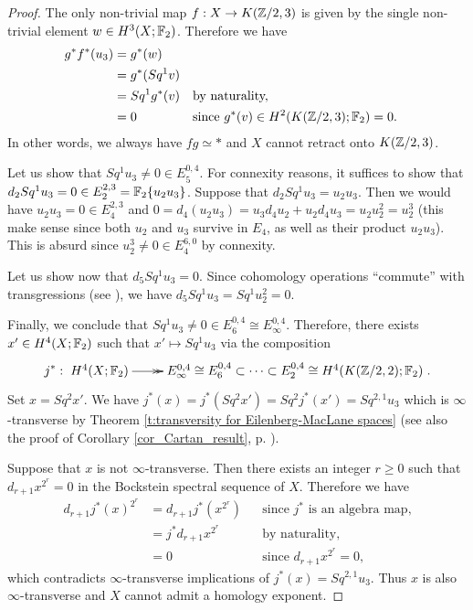 \begin{proof}
The only non-trivial map $f:X\to K(\mathbb{Z}/2,3)$ is given by the single non-trivial element $w\in H^3(X;\mathbb{F}_2)$. Therefore we have \begin{align*}
g^*f^*(u_3)&=g^*(w)\\
&=g^*(Sq^1v)\\
&=Sq^1g^*(v) &&\text{by naturality,}\\
&=0 &&\text{since $g^*(v)\in H^2(K(\mathbb{Z}/2,3);\mathbb{F}_2)=0$.}
\end{align*} In other words, we always have $fg\simeq*$ and $X$ cannot retract onto $K(\mathbb{Z}/2,3)$.

Let us show that $Sq^1u_3\not=0\in E_5^{0,4}$. For connexity reasons, it suffices to show that $d_2Sq^1u_3=0\in E_2^{2,3}=\mathbb{F}_2\{u_2u_3\}$. Suppose that $d_2Sq^1u_3=u_2u_3$. Then we would have $u_2u_3=0\in E_4^{2,3}$ and $0=d_4(u_2u_3)=u_3d_4u_2+u_2d_4u_3=u_2u_2^2=u_2^3$ (this make sense since both $u_2$ and $u_3$ survive in $E_4$, as well as their product $u_2u_3$). This is absurd since $u_2^3\not=0\in E_4^{6,0}$ by connexity. 

Let us show now that $d_5Sq^1u_3=0$. Since cohomology operations ``commute'' with transgressions (see \cite[Corollary 6.9, p. 189]{Mc00}), we have $d_5Sq^1u_3=Sq^1 u_2^2=0$. 

Finally, we conclude that $Sq^1u_3\not=0\in E_6^{0,4}\cong E_\infty^{0,4}$. Therefore, there exists $x'\in H^4(X;\mathbb{F}_2)$ such that $x'\mapsto Sq^1u_3$ via the composition
$$
j^*:\xymatrix{H^4(X;\F_2)\ar@{->>}[r] &E^{0,4}_\infty\cong E^{0,4}_6\subset\dots\subset E^{0,4}_2\cong H^4(K(\Z/2,2);\F_2)}.
$$ Set $x=Sq^2x'$. We have $j^*(x)=j^*(Sq^2x')=Sq^2j^*(x')=Sq^{2,1}u_3$ which is $\infty$-transverse by Theorem \ref{t:transversity for Eilenberg-MacLane spaces} (see also the proof of Corollary \ref{cor_Cartan_result}, p. \pageref{c:Cartan_result}). 

\label{arg:no_retract}Suppose that $x$ is not $\infty$-transverse. Then there exists an integer $r\geq0$ such that $d_{r+1}x^{2^r}=0$ in the Bockstein spectral sequence of $X$. Therefore we have
\begin{align*}
d_{r+1}j^*(x)^{2^r} &=d_{r+1}j^*(x^{2^r}) &&\text{since $j^*$ is an algebra map,}\\
&=j^*d_{r+1}x^{2^r} &&\text{by naturality,}\\
&=0 &&\text{since $d_{r+1}x^{2^r}=0$},
\end{align*} which contradicts $\infty$-transverse implications of $j^*(x)=Sq^{2,1}u_3$. Thus $x$ is also $\infty$-transverse and $X$ cannot admit a homology exponent. 
\end{proof}

\endinput